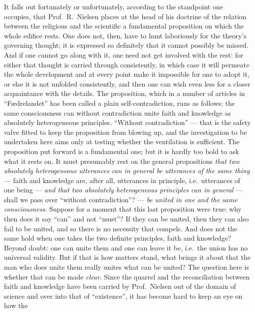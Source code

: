 \documentclass[12pt,a4paper]{book}
\newcommand{\opage}[1]{\marginnote{\footnotesize\textit{[#1]}}}
\begin{document}
\opage{25}It falls out fortunately or unfortunately, according to the
standpoint one occupies, that Prof.\ R.\ Nielsen places at the head of his
doctrine of the relation between the religious and the scientific a
fundamental proposition on which the whole edifice rests. One does not, then,
have to hunt laboriously for the theory's governing thought; it is expressed so
definitely that it cannot possibly be missed. And if one cannot go along with
it, one need not get involved with the rest: for either that thought is carried
through consistently, in which case it will permeate the whole development and
at every point make it impossible for one to adopt it, or else it is not
unfolded consistently, and then one can wish even less for a closer
acquaintance with the details. The proposition, which in a number of articles
in ``Fædrelandet'' has been called a plain self-contradiction, runs as follows:
the same consciousness can without contradiction unite faith and knowledge as
absolutely heterogeneous principles. ``Without contradiction'' --- that is the
safety valve fitted to keep the proposition from blowing
\opage{26}up, and the investigation to be undertaken here aims only at testing
whether the ventilation is sufficient. The proposition put forward is a
fundamental one; but it is hardly too bold to ask what it rests on. It must
presumably rest on the general propositions \emph{that two absolutely
heterogeneous utterances can in general be utterances of the same thing} ---
faith and knowledge are, after all, utterances in principle, i.e.\ utterances
of one being --- \emph{and that two absolutely heterogeneous principles can in
general} --- shall we pass over ``without contradiction''? --- \emph{be united
in one and the same consciousness}. Suppose for a moment that this last
proposition were true: why then does it say ``can'' and not ``must''? If they
can be united, then they can also fail to be united, and so there is no
necessity that compels. And does not the same hold when one takes the two
definite principles, faith and knowledge? Beyond doubt: one can unite them and
one can leave it be, i.e.\ the union has no universal validity. But if that is
how matters stand, what brings it about that the man who does unite them
really unites what can be united? The question here is whether that can be made
\emph{clear}. Since the quarrel and the reconciliation between faith and
knowledge have been carried by Prof.\ Nielsen out of the domain of science and
over into that of ``existence'', it has become hard to keep an eye on how the
\end{document}
